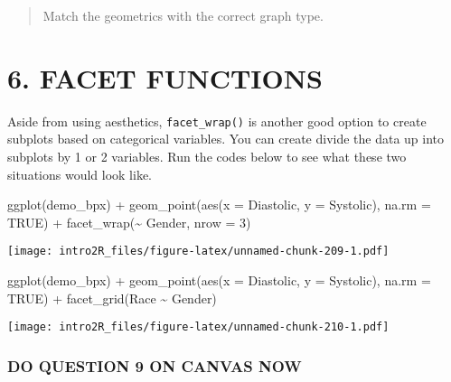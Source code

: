 \documentclass[
]{book}
\newenvironment{Shaded}{\begin{snugshade}}{\end{snugshade}}
\newcommand{\AttributeTok}[1]{\textcolor[rgb]{0.77,0.63,0.00}{#1}}
\newcommand{\ConstantTok}[1]{\textcolor[rgb]{0.00,0.00,0.00}{#1}}
\newcommand{\DecValTok}[1]{\textcolor[rgb]{0.00,0.00,0.81}{#1}}
\newcommand{\FunctionTok}[1]{\textcolor[rgb]{0.00,0.00,0.00}{#1}}
\newcommand{\NormalTok}[1]{#1}
\newcommand{\SpecialCharTok}[1]{\textcolor[rgb]{0.00,0.00,0.00}{#1}}
\begin{document}
\begin{quote}
Match the geometrics with the correct graph type.
\end{quote}

\hypertarget{facet-functions}{%
\section{6. FACET FUNCTIONS}\label{facet-functions}}

Aside from using aesthetics, \texttt{facet\_wrap()} is another good option to create subplots based on categorical variables. You can create divide the data up into subplots by 1 or 2 variables. Run the codes below to see what these two situations would look like.

\begin{Shaded}
\begin{Highlighting}[]
\FunctionTok{ggplot}\NormalTok{(demo\_bpx) }\SpecialCharTok{+}
  \FunctionTok{geom\_point}\NormalTok{(}\FunctionTok{aes}\NormalTok{(}\AttributeTok{x =}\NormalTok{ Diastolic, }\AttributeTok{y =}\NormalTok{ Systolic), }\AttributeTok{na.rm =} \ConstantTok{TRUE}\NormalTok{) }\SpecialCharTok{+}
  \FunctionTok{facet\_wrap}\NormalTok{(}\SpecialCharTok{\textasciitilde{}}\NormalTok{ Gender, }\AttributeTok{nrow =} \DecValTok{3}\NormalTok{)}
\end{Highlighting}
\end{Shaded}

\texttt{[image: intro2R\_files/figure-latex/unnamed-chunk-209-1.pdf]}

\begin{Shaded}
\begin{Highlighting}[]
\FunctionTok{ggplot}\NormalTok{(demo\_bpx) }\SpecialCharTok{+}
  \FunctionTok{geom\_point}\NormalTok{(}\FunctionTok{aes}\NormalTok{(}\AttributeTok{x =}\NormalTok{ Diastolic, }\AttributeTok{y =}\NormalTok{ Systolic), }\AttributeTok{na.rm =} \ConstantTok{TRUE}\NormalTok{) }\SpecialCharTok{+}
  \FunctionTok{facet\_grid}\NormalTok{(Race }\SpecialCharTok{\textasciitilde{}}\NormalTok{ Gender)}
\end{Highlighting}
\end{Shaded}

\texttt{[image: intro2R\_files/figure-latex/unnamed-chunk-210-1.pdf]}

\hypertarget{do-question-9-on-canvas-now}{%
\subsubsection{DO QUESTION 9 ON CANVAS NOW}\label{do-question-9-on-canvas-now}}
\end{document}
